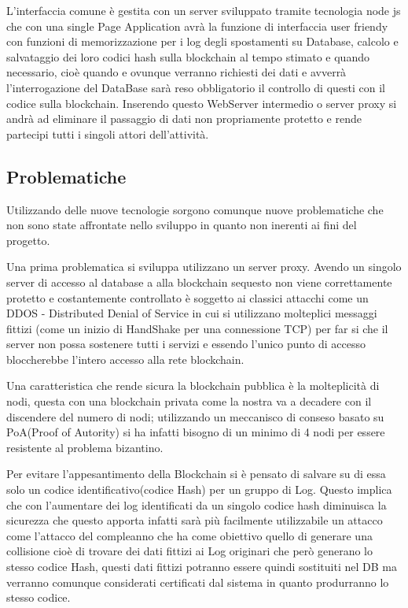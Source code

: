 \documentclass[a4paper]{report}
\begin{document}
L'interfaccia comune è gestita con un server sviluppato tramite tecnologia node js che con una single Page Application avrà la funzione di interfaccia user friendy con funzioni di memorizzazione per i log degli spostamenti su Database, calcolo e salvataggio dei loro codici hash sulla blockchain al tempo stimato e quando necessario, cioè quando e ovunque verranno richiesti dei dati e avverrà l'interrogazione del DataBase sarà reso obbligatorio il controllo di questi con il codice sulla blockchain. Inserendo questo WebServer intermedio o server proxy si andrà ad eliminare il passaggio di dati non propriamente protetto e rende partecipi tutti i singoli attori dell'attività.

\subsection{Problematiche}
Utilizzando delle nuove tecnologie sorgono comunque nuove problematiche che non sono state affrontate nello sviluppo in quanto non inerenti ai fini del progetto.

Una prima problematica si sviluppa utilizzano un server proxy. Avendo un singolo server di accesso al database a alla blockchain sequesto non viene correttamente protetto e costantemente controllato è soggetto ai classici attacchi come un DDOS - Distributed Denial of Service in cui si utilizzano molteplici messaggi fittizi (come un inizio di HandShake per una connessione TCP) per far si che il server non possa sostenere tutti i servizi e essendo l'unico punto di accesso bloccherebbe  l'intero accesso alla rete blockchain.

Una caratteristica che rende sicura la blockchain pubblica è la molteplicità di nodi, questa con una blockchain privata come la nostra va a decadere con il discendere  del numero di nodi; utilizzando un meccanisco di conseso basato su PoA(Proof of Autority) si ha infatti bisogno di un minimo di 4 nodi per essere resistente al problema bizantino.

Per evitare l'appesantimento della Blockchain si è pensato di salvare su di essa solo un codice identificativo(codice Hash) per un gruppo di Log. Questo implica che con l'aumentare dei log identificati da un singolo codice hash diminuisca la sicurezza che questo apporta infatti sarà più facilmente utilizzabile un attacco come l'attacco del compleanno che ha come obiettivo quello di generare una collisione cioè di trovare dei dati fittizi ai Log originari che però generano lo stesso codice Hash, questi dati fittizi potranno essere quindi sostituiti nel DB ma verranno comunque considerati certificati dal sistema in quanto produrranno lo stesso codice.
\end{document}
